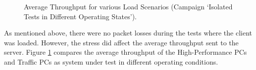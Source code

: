 \begin{figure}[htbp]
  \centering
  \caption{Average Throughput for various Load Scenarios (Campaign `Isolated Tests in Different Operating States').}
  \label{fig:resuc2}
\end{figure}

As mentioned above, there were no packet losses during the tests where the client was loaded. However, the stress did affect the average throughput sent to the server. Figure \ref{fig:resuc2} compares the average throughput of the High-Performance PCs and Traffic PCs as system under test in different operating conditions.

